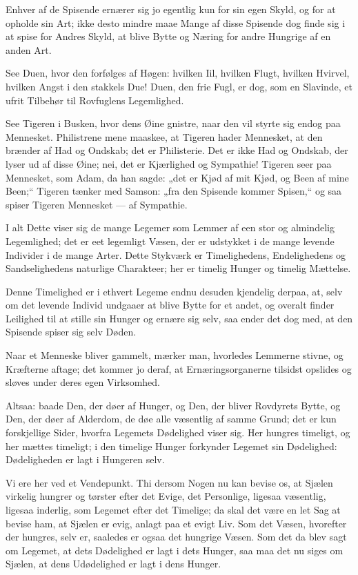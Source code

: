 \documentclass[12pt,a4paper]{book}
\newcommand{\apage}[1]{\marginnote{\footnotesize\textit{[#1]}}}
\begin{document}
Enhver af de Spisende ernærer sig jo egentlig kun for sin egen Skyld, og
for at opholde sin Art; ikke desto mindre maae Mange af disse Spisende dog
finde sig i at spise for Andres Skyld, at blive Bytte og Næring for andre
Hungrige af en anden Art.

See Duen, hvor den forfølges af Høgen: hvilken Iil, hvilken Flugt, hvilken
Hvirvel, hvilken Angst i den stakkels Due! Duen, den frie Fugl, er dog,
som en Slavinde, et ufrit Tilbehør til Rovfuglens Legemlighed.

See Tigeren i Busken, hvor dens Øine gnistre, naar den vil styrte sig
endog paa Mennesket. Philistrene mene maaskee, at Tigeren hader Mennesket,
at den brænder af Had og Ondskab; det er Philisterie. Det er ikke Had og
Ondskab, der lyser ud af disse Øine; nei, det er Kjærlighed og Sympathie!
Tigeren seer paa Mennesket, som Adam, da han sagde: „det er Kjød af mit
Kjød, og Been af mine Been;“ Tigeren tænker med Samson: „fra den Spisende
kommer Spisen,“ og saa spiser Tigeren Mennesket --- af Sympathie.

I alt Dette viser sig de mange Legemer som Lemmer af een stor og
almindelig Legemlighed; det er eet legemligt Væsen, der er udstykket i de
mange levende Individer i de mange Arter. Dette Stykværk er Timelighedens,
Endelighedens og Sandselighedens naturlige Charakteer; her er timelig
Hunger og timelig Mættelse.

Denne Timelighed er i ethvert Legeme endnu desuden kjendelig derpaa, at,
selv om det levende Individ undgaaer at blive Bytte for et andet, og
overalt finder Leilighed til at stille sin Hunger og ernære sig selv, saa
ender det dog med, at den Spisende spiser sig selv Døden.

Naar et Menneske bliver gammelt, mærker man, hvorledes Lemmerne stivne, og
Kræfterne aftage; det kommer jo deraf, at Ernæringsorganerne tilsidst
opslides og sløves under deres egen Virksomhed.

Altsaa: baade Den, der døer af Hunger, og Den, der bliver Rovdyrets Bytte,
og Den, der døer af Alderdom, de
døe alle væsentlig af samme Grund; det er kun forskjellige \apage{27} Sider, hvorfra
Legemets Dødelighed viser sig. Her hungres timeligt, og her mættes
timeligt; i den timelige Hunger forkynder Legemet sin Dødelighed:
Dødeligheden er lagt i Hungeren selv.

Vi ere her ved et Vendepunkt. Thi dersom Nogen nu kan bevise os, at Sjælen
virkelig hungrer og tørster efter det Evige, det Personlige, ligesaa
væsentlig, ligesaa inderlig, som Legemet efter det Timelige; da skal det
være en let Sag at bevise ham, at Sjælen er evig, anlagt paa et evigt Liv.
Som det Væsen, hvorefter der hungres, selv er, saaledes er ogsaa det
hungrige Væsen. Som det da blev sagt om Legemet, at dets Dødelighed er
lagt i dets Hunger, saa maa det nu siges om Sjælen, at dens Udødelighed er
lagt i dens Hunger.
\end{document}
